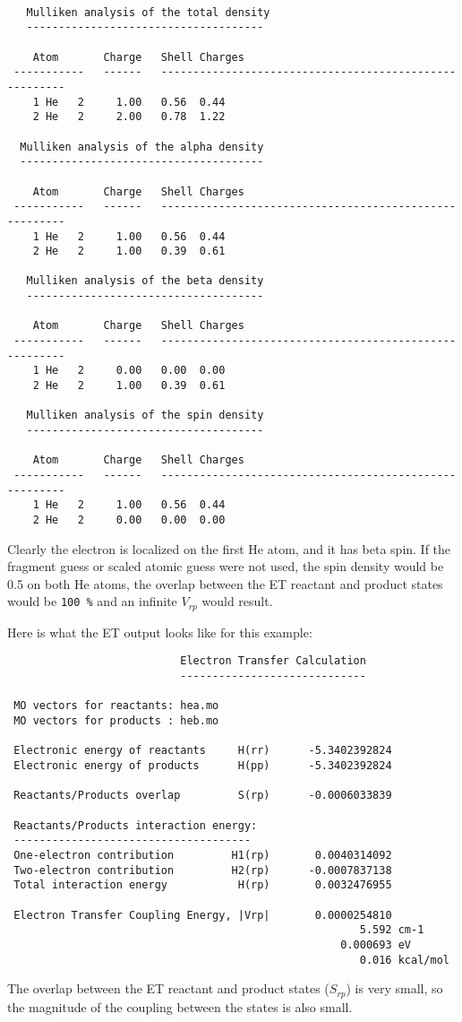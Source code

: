 \begin{verbatim}

   Mulliken analysis of the total density
   -------------------------------------

    Atom       Charge   Shell Charges
 -----------   ------   -------------------------------------------------------
    1 He   2     1.00   0.56  0.44
    2 He   2     2.00   0.78  1.22

  Mulliken analysis of the alpha density
  --------------------------------------

    Atom       Charge   Shell Charges
 -----------   ------   -------------------------------------------------------
    1 He   2     1.00   0.56  0.44
    2 He   2     1.00   0.39  0.61

   Mulliken analysis of the beta density
   -------------------------------------

    Atom       Charge   Shell Charges
 -----------   ------   -------------------------------------------------------
    1 He   2     0.00   0.00  0.00
    2 He   2     1.00   0.39  0.61

   Mulliken analysis of the spin density
   -------------------------------------

    Atom       Charge   Shell Charges
 -----------   ------   -------------------------------------------------------
    1 He   2     1.00   0.56  0.44
    2 He   2     0.00   0.00  0.00
\end{verbatim}
Clearly the electron is localized on the first He atom, and it has beta spin. If the fragment guess
or scaled atomic guess were not used, the spin density would be 0.5 on both He atoms, the overlap between
the ET reactant and product states would be \verb+100 %+ and an infinite
$V_{rp}$ would result.

Here is what the ET output looks like for this example:
\begin{verbatim}
                           Electron Transfer Calculation
                           -----------------------------

 MO vectors for reactants: hea.mo
 MO vectors for products : heb.mo

 Electronic energy of reactants     H(rr)      -5.3402392824
 Electronic energy of products      H(pp)      -5.3402392824

 Reactants/Products overlap         S(rp)      -0.0006033839

 Reactants/Products interaction energy:
 -------------------------------------
 One-electron contribution         H1(rp)       0.0040314092
 Two-electron contribution         H2(rp)      -0.0007837138
 Total interaction energy           H(rp)       0.0032476955

 Electron Transfer Coupling Energy, |Vrp|       0.0000254810
                                                       5.592 cm-1
                                                    0.000693 eV
                                                       0.016 kcal/mol
\end{verbatim}

The overlap between the ET reactant and product states ($S_{rp}$) is very small,
so the magnitude of the coupling between the states is also small. 



